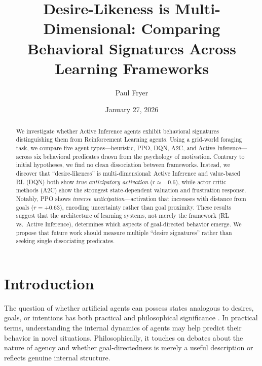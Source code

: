 \documentclass{article}
\title{Desire-Likeness is Multi-Dimensional: Comparing Behavioral Signatures Across Learning Frameworks}
\author{%
  Paul Fryer
}
\date{January 27, 2026}
\begin{document}
\maketitle

\begin{center}
\end{center}
\vspace{1em}

\begin{abstract}
We investigate whether Active Inference agents exhibit behavioral signatures distinguishing them from Reinforcement Learning agents. Using a grid-world foraging task, we compare five agent types---heuristic, PPO, DQN, A2C, and Active Inference---across six behavioral predicates drawn from the psychology of motivation. Contrary to initial hypotheses, we find no clean dissociation between frameworks. Instead, we discover that ``desire-likeness'' is multi-dimensional: Active Inference and value-based RL (DQN) both show \textit{true anticipatory activation} ($r \approx -0.6$), while actor-critic methods (A2C) show the strongest state-dependent valuation and frustration response. Notably, PPO shows \textit{inverse anticipation}---activation that increases with distance from goals ($r = +0.63$), encoding uncertainty rather than goal proximity. These results suggest that the architecture of learning systems, not merely the framework (RL vs.\ Active Inference), determines which aspects of goal-directed behavior emerge. We propose that future work should measure multiple ``desire signatures'' rather than seeking single dissociating predicates.
\end{abstract}

\section{Introduction}

The question of whether artificial agents can possess states analogous to desires, goals, or intentions has both practical and philosophical significance \cite{dennett1987intentional, bratman1987intention}. In practical terms, understanding the internal dynamics of agents may help predict their behavior in novel situations. Philosophically, it touches on debates about the nature of agency and whether goal-directedness is merely a useful description or reflects genuine internal structure.
\end{document}
